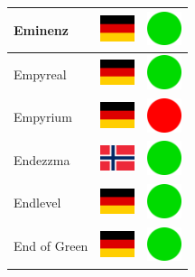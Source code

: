\documentclass[12pt, a4paper, twoside]{report}
\begin{document}
\begin{center}
\begin{longtable}{|p{5cm}|p{2cm}|p{2cm}|}
 Eminenz                                                    & \includegraphics[width=1cm]{../4x3/de} &   \includegraphics[width=1cm]{../likes/y} \\ \hline
 Empyreal                                                   & \includegraphics[width=1cm]{../4x3/de} &   \includegraphics[width=1cm]{../likes/y} \\ \hline
 Empyrium                                                   & \includegraphics[width=1cm]{../4x3/de} &   \includegraphics[width=1cm]{../likes/n} \\ \hline
 Endezzma                                                   & \includegraphics[width=1cm]{../4x3/no} &   \includegraphics[width=1cm]{../likes/y} \\ \hline
 Endlevel                                                   & \includegraphics[width=1cm]{../4x3/de} &   \includegraphics[width=1cm]{../likes/y} \\ \hline
 End of Green                                               & \includegraphics[width=1cm]{../4x3/de} &   \includegraphics[width=1cm]{../likes/y} \\ \hline

\end{longtable}
\end{center}
\end{document}
